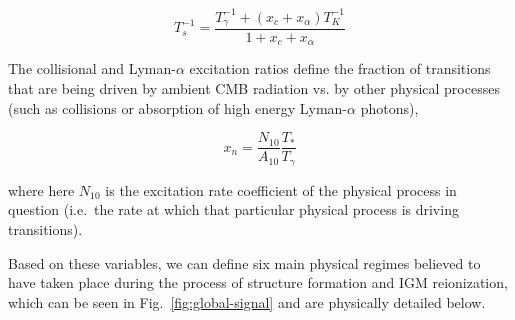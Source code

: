 \begin{equation}
    T_s^{-1} = \frac{T_\gamma^{-1} + (x_c + x_\alpha) T_K^{-1}}{1 + x_c + 
    x_\alpha}
    \label{eq:spin-temperature}
\end{equation}

The collisional and Lyman-$\alpha$ excitation ratios define the fraction of 
transitions that are being driven by ambient CMB radiation vs. by other 
physical processes (such as collisions or absorption of high energy 
Lyman-$\alpha$ photons),

\begin{equation}
    x_n = \frac{N_{10}}{A_{10}}\frac{T_*}{T_\gamma}
    \label{eq:excitation-ratio}
\end{equation}

\noindent where here $N_{10}$ is the excitation rate coefficient of the 
physical process in question (i.e.~the rate at which that particular physical 
process is driving transitions).

Based on these variables, we can define six main physical regimes believed to 
have taken place during the process of structure formation and IGM 
reionization, which can be seen in Fig.~\ref{fig:global-signal} and are 
physically detailed below.

